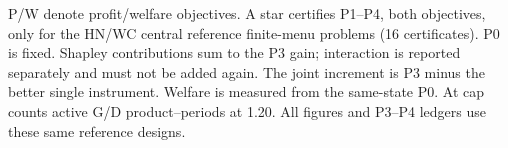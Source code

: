 \begin{table}[htbp]
\begin{minipage}{.95\textwidth}
\begin{tabular*}{\linewidth}{@{\extracolsep{\fill}}llrrrrrr@{}}
\bottomrule\end{tabular*}\par\medskip
\par\noindent\fontsize{8}{9.5}\selectfont P/W denote profit/welfare objectives. A star certifies P1--P4, both objectives, only for the HN/WC central reference finite-menu problems (16 certificates). P0 is fixed. Shapley contributions sum to the P3 gain; interaction is reported separately and must not be added again. The joint increment is P3 minus the better single instrument. Welfare is measured from the same-state P0. At cap counts active G/D product--periods at 1.20. All figures and P3--P4 ledgers use these same reference designs.
\end{minipage}\end{table}
